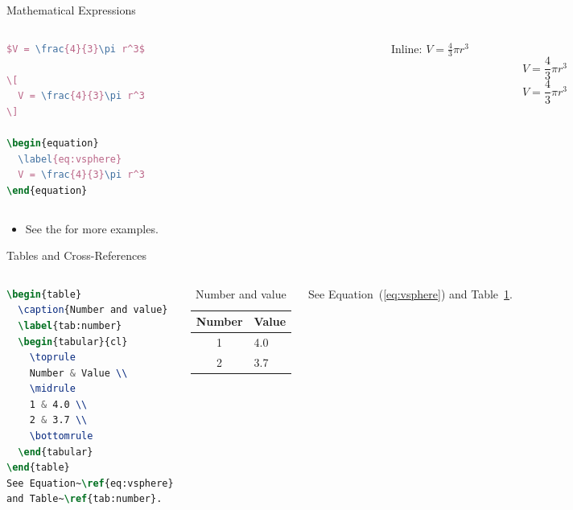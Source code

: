 \documentclass{beamer}
\begin{document}
\begin{frame}[fragile]{Mathematical Expressions}
  \begin{columns}
    \begin{column}{.55\textwidth}
\begin{lstlisting}[language=TeX]
$V = \frac{4}{3}\pi r^3$

\[
  V = \frac{4}{3}\pi r^3
\]

\begin{equation}
  \label{eq:vsphere}
  V = \frac{4}{3}\pi r^3
\end{equation}
\end{lstlisting}
    \end{column}
    \begin{column}{.4\textwidth}
      Inline: $V = \frac{4}{3}\pi r^3$
      \[
        V = \frac{4}{3}\pi r^3
      \]
      \begin{equation}
        \label{eq:vsphere}
        V = \frac{4}{3}\pi r^3
      \end{equation}
    \end{column}
  \end{columns}
  \begin{itemize}
    \item See the
      \href{https://en.wikibooks.org/wiki/LaTeX/Mathematics}
      {}
      for more examples.
  \end{itemize}
\end{frame}

\begin{frame}[fragile]{Tables and Cross-References}
  \begin{columns}
\begin{lstlisting}[language=TeX]
\begin{table}
  \caption{Number and value}
  \label{tab:number}
  \begin{tabular}{cl}
    \toprule
    Number & Value \\
    \midrule
    1 & 4.0 \\
    2 & 3.7 \\
    \bottomrule
  \end{tabular}
\end{table}
See Equation~\ref{eq:vsphere}
and Table~\ref{tab:number}.
\end{lstlisting}
      \begin{table}
        \centering
        \caption{Number and value}
        \label{tab:number}
        \begin{tabular}{cl}
          \toprule
          Number & Value \\\midrule
          1 & 4.0\\
          2 & 3.7\\\bottomrule
        \end{tabular}
      \end{table}
      See Equation~(\ref{eq:vsphere}) and Table~\ref{tab:number}.
  \end{columns}
\end{frame}
\end{document}
